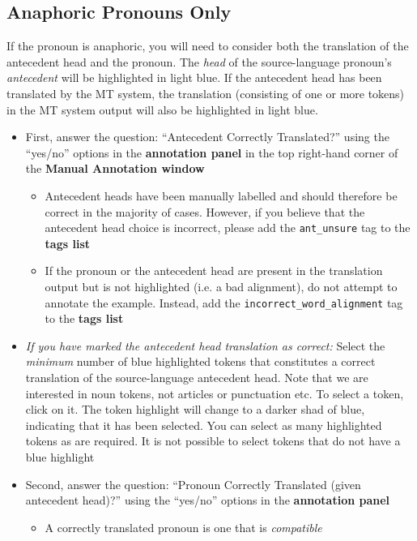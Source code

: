 \documentclass[11pt]{article} %
\newcommand\tag[1]{\texttt{#1}}
\begin{document}
\subsection{Anaphoric Pronouns Only}
\label{AnaphoricGuidelines}

If the pronoun is anaphoric, you will need to consider both the translation of the antecedent head and the pronoun. The \textit{head} of the source-language pronoun's \textit{antecedent} will be highlighted in light blue. If the antecedent head has been translated by the MT system, the translation (consisting of one or more tokens) in the MT system output will also be highlighted in light blue.

\begin{itemize}
  \item First, answer the question: ``Antecedent Correctly Translated?'' using the ``yes/no'' options in the \textbf{annotation panel} in the top right-hand corner of the \textbf{Manual Annotation window}
  \begin{itemize}
    \item Antecedent heads have been manually labelled and should therefore be correct in the majority of cases. However, if you believe that the antecedent head choice is incorrect, please add the \tag{ant\_unsure} tag to the \textbf{tags list}
    \item If the pronoun or the antecedent head are present in the translation output but is not highlighted (i.e. a bad alignment), do not attempt to annotate the example. Instead, add the \tag{incorrect\_word\_alignment} tag to the \textbf{tags list}
  \end{itemize}  
  \item \textit{If you have marked the antecedent head translation as correct:} Select the \textit{minimum} number of blue highlighted tokens that constitutes a correct translation of the source-language antecedent head. Note that we are interested in noun tokens, not articles or punctuation etc. To select a token, click on it. The token highlight will change to a darker shad of blue, indicating that it has been selected. You can select as many highlighted tokens as are required. It is not possible to select tokens that do not have a blue highlight
  \item Second, answer the question: ``Pronoun Correctly Translated (given antecedent head)?'' using the ``yes/no'' options in the \textbf{annotation panel}
  \begin{itemize}
    \item A correctly translated pronoun is one that is \textit{compatible}

\end{itemize}
\end{itemize}
\end{document}
